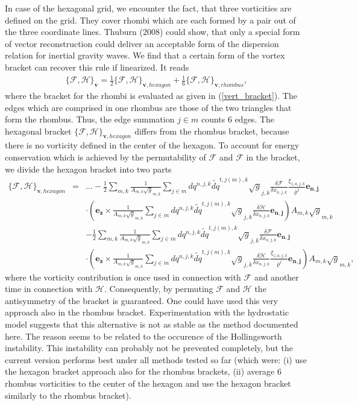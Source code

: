 In case of the hexagonal grid, we encounter the fact, that three vorticities are defined
on the grid. They cover rhombi which are each formed by a pair out of the three coordinate
lines. Thuburn (2008) could show, that only a special form of vector reconstruction could
deliver an acceptable form of the dispersion relation for inertial gravity waves. We
find that a certain form of the vortex bracket can recover this rule if linearized. It reads
\begin{eqnarray*}
 \{\mathcal{F},\mathcal{H}\}_{\mathbf{v}}=
\frac{1}{2}\{\mathcal{F},\mathcal{H}\}_{\mathbf{v},hexagon}
+\frac{1}{6}\{\mathcal{F},\mathcal{H}\}_{\mathbf{v},rhombus},
\end{eqnarray*}
where the bracket for the rhombi is evaluated as given in (\ref{vert_bracket}). The edges
which are comprised in one rhombus are those of the two triangles that form the rhombus.
Thus, the edge summation $j\in m$ counts 6 edges. The hexagonal bracket $\{\mathcal{F},\mathcal{H}\}_{\mathbf{v},hexagon}$ differs from the rhombus bracket,
because there is no vorticity defined in the center of the hexagon. To account for
energy conservation which is achieved by the permutability of $\mathcal{F}$ and
$\mathcal{F}$ in the bracket, we divide the hexagon bracket into two parts
\begin{eqnarray*}
 \{\mathcal{F},\mathcal{H}\}_{\mathbf{v},hexagon}&=&...-\frac{1}{2}\sum_{m,k}
\frac{1}{A_{m,k}\sqrt{g}_{m,k}}\sum_{j\in m} dq^{n,j,k}\widetilde{dq}^{t,j(m),k}
\sqrt{g}_{j,k}\frac{\delta\mathcal{F}}{\delta\dot{x}_{n,j,k}}
\frac{\xi_{z,a,j,k}}{\overline{\varrho}^j}
\mathbf{e_{n,j}}
\\&&
\cdot\left(\mathbf{e_z}\times
\frac{1}{A_{m,k}\sqrt{g}_{m,k}}\sum_{j\in m} dq^{n,j,k}\widetilde{dq}^{t,j(m),k}
\sqrt{g}_{j,k}\frac{\delta\mathcal{H}}{\delta\dot{x}_{n,j,k}}\mathbf{e_{n,j}}
\right){A_{m,k}\sqrt{g}_{m,k}}\\
&&-\frac{1}{2}\sum_{m,k}
\frac{1}{A_{m,k}\sqrt{g}_{m,k}}\sum_{j\in m} dq^{n,j,k}\widetilde{dq}^{t,j(m),k}
\sqrt{g}_{j,k}\frac{\delta\mathcal{F}}{\delta\dot{x}_{n,j,k}}
\mathbf{e_{n,j}}
\\&&
\cdot\left(\mathbf{e_z}\times
\frac{1}{A_{m,k}\sqrt{g}_{m,k}}\sum_{j\in m} dq^{n,j,k}\widetilde{dq}^{t,j(m),k}
\sqrt{g}_{j,k}\frac{\delta\mathcal{H}}{\delta\dot{x}_{n,j,k}}
\frac{\xi_{z,a,j,k}}{\overline{\varrho}^j}\mathbf{e_{n,j}}
\right){A_{m,k}\sqrt{g}_{m,k}},
\end{eqnarray*}
where the vorticity contribution is once used in connection with $\mathcal{F}$ and
another time in connection with $\mathcal{H}$. Consequently, by permuting $\mathcal{F}$
and $\mathcal{H}$ the antisymmetry of the bracket is guaranteed. One could have used
this very approach also in the rhombus bracket. Experimentation with the hydrostatic
model suggests that this alternative is not as stable as the method documented here. The
reason seems to be related to the occurence of the Hollingsworth instability. This
instability can probably not be prevented completely, but the current version performs
best under all methods tested so far (which were: (i) use the hexagon bracket approach
also for the rhombus brackets, (ii) average 6 rhombus vorticities to the center of the
hexagon and use the hexagon bracket similarly to the rhombus bracket).

